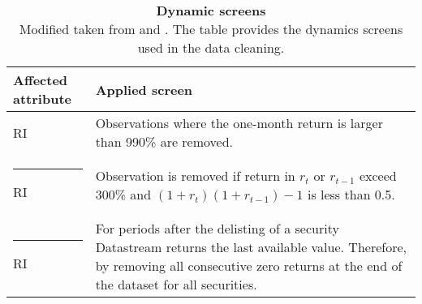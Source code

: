 \documentclass[12pt]{article}
\begin{document}
\begin{appendices}
\begin{table}[H] 
\footnotesize
\caption[Dynamic screens]{\textbf{Dynamic screens}\\ Modified taken from \protect\citet{Ince2006} and \protect\citet{HANAUER2023106712}. The table provides the dynamics screens used in the data cleaning.}
 \label{table:DynamicScreens}
\centering
\begin{tabularx}{\textwidth}{l X}
\toprule
Affected attribute & Applied screen \\
\midrule
RI 		& Observations where the one-month return is larger than 990\% are removed.\\ \rule{-1ex}{3ex}
RI		& Observation is removed if return in $r_t$ or $r_{t-1}$ exceed 300\% and $(1+r_{t})(1+r_{t-1}) -1$ is less than 0.5. \\ \rule{-1ex}{3ex}
RI 		& For periods after the delisting of a security Datastream returns the last available value. Therefore, by removing all consecutive zero returns at the end of the dataset for all securities.\\
 \bottomrule
 \end{tabularx}
 \end{table} 


\end{appendices}
\end{document}
